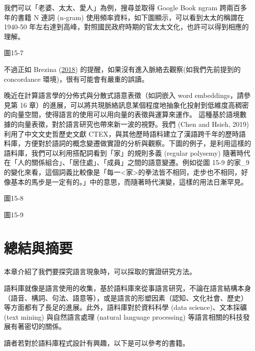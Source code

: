 我們可以「老婆、太太、愛人」為例，搜尋並取得 Google Book ngram 跨兩百多年的書籍 N 連詞 (n-gram) 使用頻率資料，如下圖顯示，可以看到太太的稱謂在 1940-50 年左右達到高峰，對照國民政府時期的官太太文化，也許可以得到相應的理解。  
 

圖15-7

不過正如 Brezina (\hyperlink{bookmarkid41mghml}{2018}) 的提醒，如果沒有進入脈絡去觀察(如我們先前提到的 concordance 環境)，很有可能會有嚴重的誤讀。

晚近在計算語言學的分佈式與分散式語意表徵（如詞嵌入 word embeddings，請參見第 16 章）的進展，可以將共現脈絡訊息某個程度地抽象化投射到低維度高稠密的向量空間，使得語言的使用可以用向量的表徵與運算來運作。 這種基於語境數據的向量表徵，對於語言研究也帶來新一波的視野。我們 (Chen and Hsieh, 2019) 利用了中文文史哲歷史文獻 CTEX，與其他歷時語料建立了漢語跨千年的歷時語料庫，方便對於語詞的概念變遷做實證的分析與觀察。下圖的例子，是利用這樣的語料庫，我們可以利用搭配詞看到「家」的規則多義 (regular polysemy) 隨著時代在「人的關係組合」、「居住處」、「成員」之間的語意變遷。例如從圖 15-9 的家\_9的變化來看，這個詞義比較像是「每一<家>的拳法皆不相同，走步也不相同，好像基本的馬步是一定有的。」中的意思，而隨著時代演變，這樣的用法日漸罕見。  
 

圖15-8

  
 

圖15-9

\section{總結與摘要}

本章介紹了我們要探究語言現象時，可以採取的實證研究方法。

語料庫就像是語言使用的收集，基於語料庫來從事語言研究，不論在語言結構本身（語音、構詞、句法、語意等），或是語言的形塑因素（認知、文化社會、歷史）等方面都有了長足的進展。此外，語料庫對於資料科學 (data science)、文本採礦 (text mining) 與自然語言處理 (natural language processing) 等語言相關的科技發展有著密切的關係。

讀者若對於語料庫程式設計有興趣，以下是可以參考的書籍。

